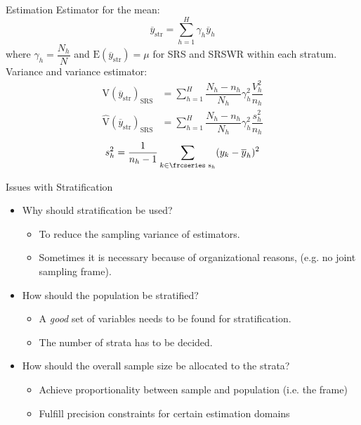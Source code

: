 \documentclass[10pt]{beamer}\usepackage[]{graphicx}\usepackage[]{color}
\newcommand{\textfrc}[1]{{\frcseries#1}}
\newcommand{\mathfrc}[1]{\text{\textfrc{#1}}}
\newcommand{\E}[1]{\text{E}\left(#1\right)}
\newcommand{\V}[1]{\text{V}\left(#1\right)}
\newcommand{\Vest}[1]{\widehat{\text{V}}\left(#1\right)}
\begin{document}
\begin{frame}{Estimation}
  Estimator for the mean:
  \begin{equation*}
  \overline{y}_{\text{str}} = \sum_{h=1}^H \gamma_h \overline{y}_h
  \end{equation*}
  where $\gamma_h = \dfrac{N_h}{N}$ and $\E{\overline{y}_{\text{str}}} = \mu$ for SRS and SRSWR within each stratum.
  \newline
  Variance and variance estimator:
  \begin{align*}
  \V{\overline{y}_{\text{str}}}_{\text{SRS}} & = \sum_{h=1}^H \dfrac{N_h-n_h}{N_h} \gamma_h^2 \dfrac{V_{h}^2}{n_h} \\
  \Vest{\overline{y}_{\text{str}}}_{\text{SRS}} & = \sum_{h=1}^H \dfrac{N_h-n_h}{N_h} \gamma_h^2 \dfrac{s_{h}^2}{n_h} 
  \end{align*}
  \begin{equation*}
  s^2_{h} = \dfrac{1}{n_h-1} \sum_{k \in \mathfrc{s}_h} (y_k - \overline{y}_h)^2
  \end{equation*}

\end{frame}


\begin{frame}{Issues with Stratification}
\begin{itemize}
\item<1-> Why should stratification be used?
\begin{itemize}
\item<2-> To reduce the sampling variance of estimators.
\item<2-> Sometimes it is necessary because of organizational reasons, (e.g. no joint sampling frame).
\end{itemize}
\item<3-> How should the population be stratified?
\begin{itemize}
\item<4-> A \emph{good} set of variables needs to be found for stratification.
\item<4-> The number of strata has to be decided.
\end{itemize}
\item<6-> How should the overall sample size be allocated to the strata?
\begin{itemize}
\item<7-> Achieve proportionality between sample and population (i.e. the frame)
\item<7-> Fulfill precision constraints for certain estimation domains
\end{itemize}
\end{itemize}

\end{frame}
\end{document}
